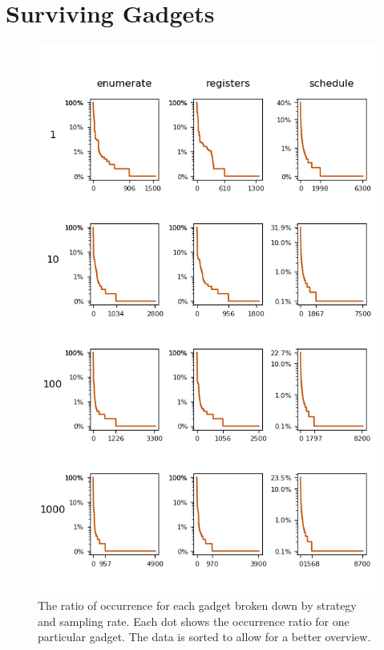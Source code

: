 \section{Surviving Gadgets}


\begin{figure}[htp]
	\centering
	\includegraphics[width=\textwidth,height=\textheight]{results/figures/gadgets}
	\caption{The ratio of occurrence for each gadget broken down by strategy and sampling rate.
Each dot shows the occurrence ratio for one particular gadget. The data is sorted to allow
	for a better overview.}
	\label{fig:gadgets}
\end{figure}

